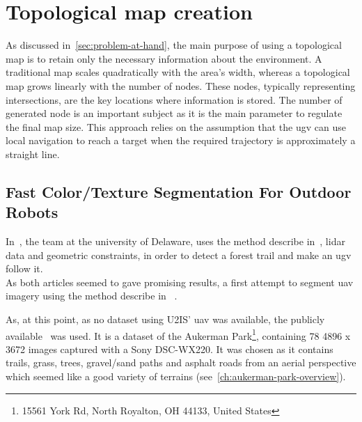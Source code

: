 \chapter{Topological map creation}\label{ch:topological-map-creation}

As discussed in~\ref{sec:problem-at-hand}, the main purpose of using a topological map is to retain only the necessary information about the environment.
A traditional map scales quadratically with the area’s width, whereas a topological map grows linearly with the number of nodes.
These nodes, typically representing intersections, are the key locations where information is stored.
The number of generated node is an important subject as it is the main parameter to regulate the final map size.
This approach relies on the assumption that the \gls{ugv} can use local navigation to reach a target when the required trajectory is approximately a straight line.


\section{Fast Color/Texture Segmentation For Outdoor Robots}

In~\cite{rasmussen_appearance_2009}, the team at the university of Delaware, uses the method describe in~\cite{rufus_blas_fast_2008},
lidar data and geometric constraints, in order to detect a forest trail and make an \gls{ugv} follow it.\\
As both articles seemed to gave promising results, a first attempt to segment \gls{uav} imagery using the method describe in
~\cite{rufus_blas_fast_2008}.

As, at this point, as no dataset using U2IS' \gls{uav} was available, the publicly available~\cite{noauthor_aukerman_nodate} was used.
It is a dataset of the Aukerman Park\footnote{15561 York Rd, North Royalton, OH 44133, United States}, containing 78
4896 x 3672 images captured with a Sony DSC-WX220.
It was chosen as it contains trails, grass, trees, gravel/sand paths and asphalt roads from an aerial perspective which
seemed like a good variety of terrains (see~\cref{ch:aukerman-park-overview}).

